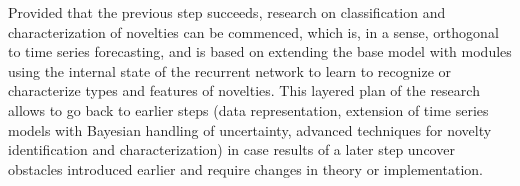 \documentclass{paper}
\begin{document}
Provided that the previous step succeeds, research on classification and characterization of novelties can be commenced, which is, in a sense, orthogonal to time series forecasting, and is based on extending the base model with modules using the internal state of the recurrent network to learn to recognize or characterize types and features of novelties. This layered plan of the research allows to go back to earlier steps (data representation, extension of time series models with Bayesian handling of uncertainty, advanced techniques for novelty identification and characterization) in case results of a later step uncover obstacles introduced earlier and require changes in theory or implementation. 
\end{document}
